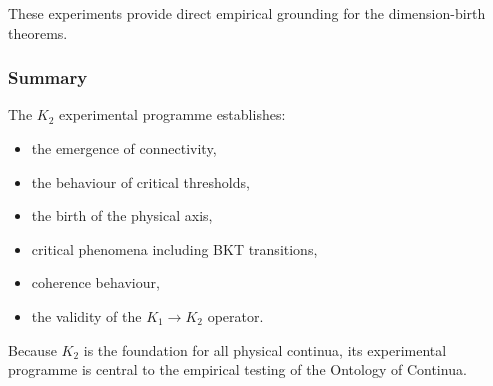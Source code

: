 These experiments provide direct empirical grounding for the
dimension-birth theorems.



\subsubsection{Summary}

The $K_2$ experimental programme establishes:

\begin{itemize}
    \item the emergence of connectivity,
    \item the behaviour of critical thresholds,
    \item the birth of the physical axis,
    \item critical phenomena including BKT transitions,
    \item coherence behaviour,
    \item the validity of the $K_1\rightarrow K_2$ operator.
\end{itemize}

Because $K_2$ is the foundation for all physical continua,
its experimental programme is central to the empirical testing of the
Ontology of Continua.
